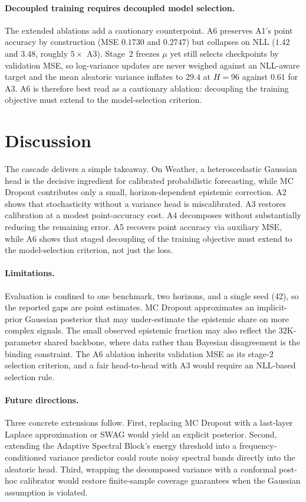 \documentclass{llncs}
\begin{document}
\paragraph{Decoupled training requires decoupled model selection.}
The extended ablations add a cautionary counterpoint. A6 preserves A1's point accuracy by construction (MSE $0.1730$ and $0.2747$) but collapses on NLL ($1.42$ and $3.48$, roughly $5\times$ A3). Stage~2 freezes $\mu$ yet still selects checkpoints by validation MSE, so log-variance updates are never weighed against an NLL-aware target and the mean aleatoric variance inflates to $29.4$ at $H{=}96$ against $0.61$ for A3. A6 is therefore best read as a cautionary ablation: decoupling the training objective must extend to the model-selection criterion.

\section{Discussion}
\label{sec:discussion}

The cascade delivers a simple takeaway. On Weather, a heteroscedastic Gaussian head is the decisive ingredient for calibrated probabilistic forecasting, while MC Dropout contributes only a small, horizon-dependent epistemic correction. A2 shows that stochasticity without a variance head is miscalibrated. A3 restores calibration at a modest point-accuracy cost. A4 decomposes without substantially reducing the remaining error. A5 recovers point accuracy via auxiliary MSE, while A6 shows that staged decoupling of the training objective must extend to the model-selection criterion, not just the loss.

\paragraph{Limitations.}
Evaluation is confined to one benchmark, two horizons, and a single seed (42), so the reported gaps are point estimates. MC Dropout approximates an implicit-prior Gaussian posterior that may under-estimate the epistemic share on more complex signals. The small observed epistemic fraction may also reflect the $32$K-parameter shared backbone, where data rather than Bayesian disagreement is the binding constraint. The A6 ablation inherits validation MSE as its stage-2 selection criterion, and a fair head-to-head with A3 would require an NLL-based selection rule.

\paragraph{Future directions.}
Three concrete extensions follow. First, replacing MC Dropout with a last-layer Laplace approximation or SWAG would yield an explicit posterior. Second, extending the Adaptive Spectral Block's energy threshold into a frequency-conditioned variance predictor could route noisy spectral bands directly into the aleatoric head. Third, wrapping the decomposed variance with a conformal post-hoc calibrator would restore finite-sample coverage guarantees when the Gaussian assumption is violated.
\end{document}
